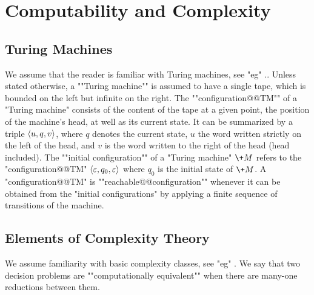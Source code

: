 
\section{Computability and Complexity}

\subsection{Turing Machines}

We assume that the reader is familiar with Turing machines,
see "eg" \cite[\S~1]{AroraBarak2009ComputationalComplexity}..
Unless stated otherwise, a \AP""Turing machine"" is assumed to have a single tape,
which is bounded on the left but infinite on the right.
The ""configuration@@TM"" of a "Turing machine" consists of
the content of the tape at a given point, the position of the machine's head,
at well as its current state. It can be summarized by
a triple $\langle u, q, v\rangle$, where $q$ denotes the current state,
$u$ the word written strictly on the left of the head,
and $v$ is the word written to the right of the head (head included).
The \AP""initial configuration"" of a "Turing machine" $\+M$ refers to the "configuration@@TM" 
$\langle\varepsilon, q_0, \varepsilon\rangle$ where $q_0$ is the initial state of $\+M$.
A "configuration@@TM" is \AP""reachable@@configuration"" whenever
it can be obtained from the "initial configurations" by applying a finite sequence
of transitions of the machine.

\subsection{Elements of Complexity Theory}

We assume familiarity with basic complexity classes, see "eg"
\cite[\S\!\S~2--5]{AroraBarak2009ComputationalComplexity}.
We say that two decision problems are \AP""computationally equivalent""
when there are many-one reductions between them.


